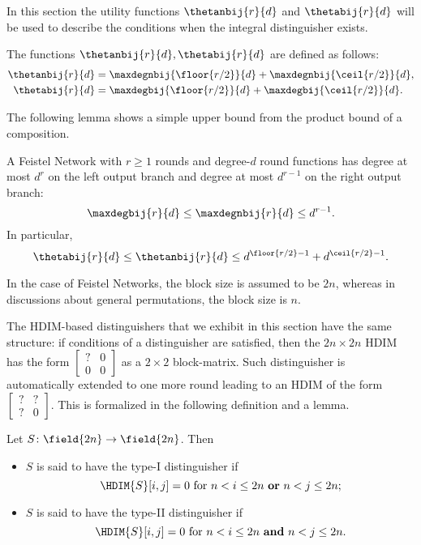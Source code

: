 In this section the utility functions $\thetanbij{r}{d}$ and $\thetabij{r}{d}$ will be used to describe the conditions when the integral distinguisher exists.

\begin{definition}
The functions $\thetanbij{r}{d}, \thetabij{r}{d}$ are defined as follows:
\begin{align*}
    \thetanbij{r}{d} &= \maxdegnbij{\floor{r/2}}{d} + \maxdegnbij{\ceil{r/2}}{d},\\
    \thetabij{r}{d} &= \maxdegbij{\floor{r/2}}{d} + \maxdegbij{\ceil{r/2}}{d}.
\end{align*}
\end{definition}

The following lemma shows a simple upper bound from the product bound of a composition.

\begin{lemma}
A Feistel Network with $r \ge 1$ rounds and degree-$d$ round functions has degree at most $d^r$ on the left output branch and degree at most $d^{r-1}$ on the right output branch:
$$
\maxdegbij{r}{d} \le \maxdegnbij{r}{d} \le d^{r-1}.
$$
In particular,
$$
\thetabij{r}{d} \le \thetanbij{r}{d} \le d^{\floor{r/2}-1} + d^{\ceil{r/2}-1}.
$$
\end{lemma}

\begin{remark}
In the case of Feistel Networks, the block size is assumed to be $2n$, whereas in discussions about general permutations, the block size is $n$.
\end{remark}

The HDIM-based distinguishers that we exhibit in this section have the same structure: if conditions of a distinguisher are satisfied, then the $2n\times 2n$ HDIM has the form $\begin{bmatrix}? & 0 \\ 0 & 0\end{bmatrix}$ as a $2\times 2$ block-matrix. Such distinguisher is automatically extended to one more round leading to an HDIM of the form $\begin{bmatrix}? & ? \\ ? & 0\end{bmatrix}$. This is formalized in the following definition and a lemma.

\begin{definition}
Let $S\colon \field{2n} \to \field{2n}$. Then
\begin{itemize}
    \item $S$ is said to have the type-I distinguisher if
    $$\HDIM{S}[i,j] = 0 ~\text{for}~ n < i \le 2n ~\text{\bf or}~ n < j \le 2n;$$
    \item $S$ is said to have the type-II distinguisher if
    $$\HDIM{S}[i,j] = 0 ~\text{for}~ n < i \le 2n ~\text{\bf and}~ n < j \le 2n.$$
\end{itemize}
\end{definition}

